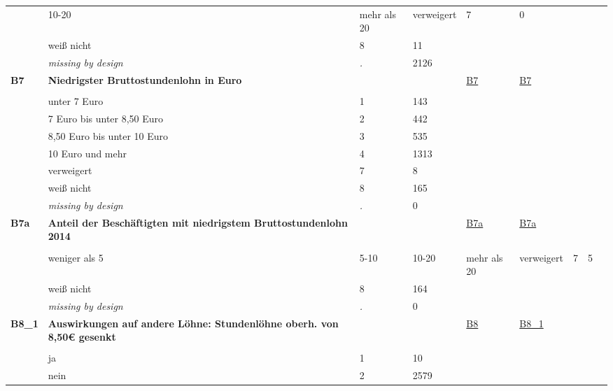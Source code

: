 \begin{longtable}{| L{2.45cm} | L{6cm} | C{1.5cm} | R{1cm} | C{2.25cm} | C{2.25cm} |}
   & 10-20%
   & mehr als 20%
   & verweigert & 7 & 0 &  &  \\ 
   & weiß nicht & 8 & 11 &  &  \\ 
   & \textit{missing by design} & \textit{.} & 2126 &  &  \\ 
   \midrule
\textbf{B7}\label{var:B7} & \textbf{Niedrigster Bruttostundenlohn in Euro} &  &  & \hyperref[B7]{B7} & \hyperref[var:suf:B7]{B7} \\ 
   &  &  &  &  &  \\ 
   & unter 7 Euro & 1 & 143 &  &  \\ 
   & 7 Euro bis unter 8,50 Euro & 2 & 442 &  &  \\ 
   & 8,50 Euro bis unter 10 Euro & 3 & 535 &  &  \\ 
   & 10 Euro und mehr & 4 & 1313 &  &  \\ 
   & verweigert & 7 & 8 &  &  \\ 
   & weiß nicht & 8 & 165 &  &  \\ 
   & \textit{missing by design} & \textit{.} & 0 &  &  \\ 
   \midrule
\textbf{B7a}\label{var:B7a} & \textbf{Anteil der Beschäftigten mit niedrigstem Bruttostundenlohn 2014} &  &  & \hyperref[B7a]{B7a} & \hyperref[var:suf:B7a]{B7a} \\ 
   &  &  &  &  &  \\ 
   & weniger als 5%
   & 5-10%
   & 10-20%
   & mehr als 20%
   & verweigert & 7 & 5 &  &  \\ 
   & weiß nicht & 8 & 164 &  &  \\ 
   & \textit{missing by design} & \textit{.} & 0 &  &  \\ 
   \midrule
\textbf{B8\_1}\label{var:B8:1} & \textbf{Auswirkungen auf andere Löhne: Stundenlöhne oberh. von 8,50€ gesenkt} &  &  & \hyperref[B8]{B8} & \hyperref[var:suf:B8:1]{B8\_1} \\ 
   &  &  &  &  &  \\ 
   & ja & 1 & 10 &  &  \\ 
   & nein & 2 & 2579 &  &  \\ 

\end{longtable}
